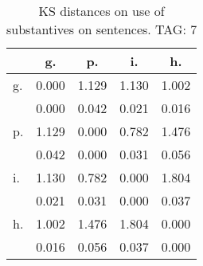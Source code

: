 \begin{table}[h!]
\begin{center}
\begin{tabular}{| l | c | c | c | c |}\hline
 & g. & p. & i. & h. \\\hline
g. & 0.000  & 1.129  & 1.130  & 1.002 \\\hline
 & 0.000  & 0.042  & 0.021  & 0.016 \\\hline
p. & 1.129  & 0.000  & 0.782  & 1.476 \\\hline
 & 0.042  & 0.000  & 0.031  & 0.056 \\\hline
i. & 1.130  & 0.782  & 0.000  & 1.804 \\\hline
 & 0.021  & 0.031  & 0.000  & 0.037 \\\hline
h. & 1.002  & 1.476  & 1.804  & 0.000 \\\hline
 & 0.016  & 0.056  & 0.037  & 0.000 \\\hline
\end{tabular}
\caption{KS distances on use of substantives on sentences. TAG: 7}
\end{center}
\end{table}